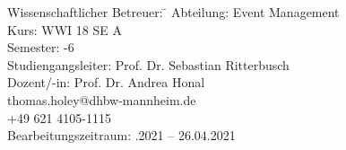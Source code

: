 \begin{titlepage}
    
    
        \begin{minipage}{\textwidth}
    
            \begin{tabbing}
                
                Wissenschaftlicher Betreuer: \hspace{0.85cm}\=\kill
                Abteilung: \> Event Management \\[1.5mm]
                Kurs: \> WWI 18 SE A \\[1.5mm]
                Semester: -6 \\[1.5mm]
                Studiengangsleiter: \> Prof. Dr. Sebastian Ritterbusch  \\[1.5mm]
                Dozent/-in: \> Prof. Dr. Andrea Honal \\
                \> thomas.holey@dhbw-mannheim.de \\
                \> +49 621 4105-1115 \\[1.5mm]
                Bearbeitungszeitraum: .2021 -- 26.04.2021
               
            \end{tabbing}
    
    \end{minipage}
    
\end{titlepage}